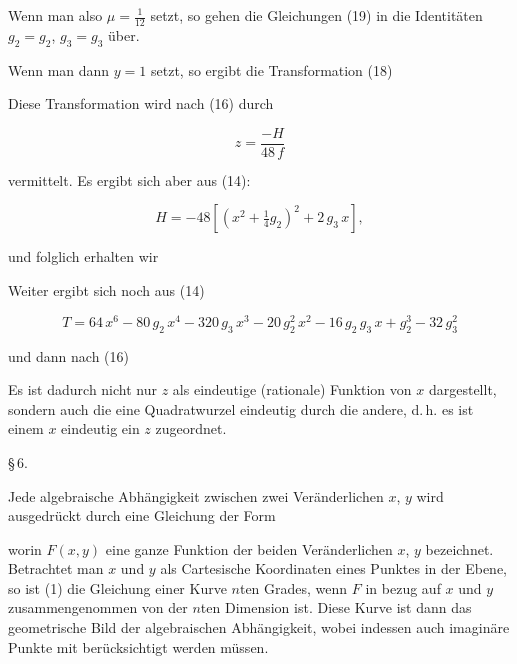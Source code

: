 
Wenn man also $\mu = \frac{1}{12}$ setzt, so gehen die Gleichungen (19)
in die Identitäten $g_2=g_2$, $g_3=g_3$ über.

Wenn man dann $y=1$ setzt, so ergibt die Transformation (18)


Diese Transformation wird nach (16) durch

\[ z = \dfrac{-H}{48\,f} \]

vermittelt. Es ergibt sich aber aus (14):

\[ H = -48\left[(x^2+\tfrac{1}{4}g_2)^2 + 2\,g_3\,x\right], \]

und folglich erhalten wir


Weiter ergibt sich noch aus (14)

\[ T = 64\,x^6 - 80\,g_2\,x^4 - 320\,g_3\,x^3 - 20\,g_2^2\,x^2 - 16\,g_2\,g_3\,x + g_2^3 - 32\,g_3^2 \]

und dann nach (16)


 Es ist dadurch nicht nur
$z$ als eindeutige (rationale) Funktion von $x$ dargestellt,
sondern auch die eine Quadratwurzel eindeutig durch die andere,
d.\,h. es ist einem  $x$ eindeutig ein  $z$ zugeordnet.

\begin{center}
§\,6. 
\end{center}

Jede algebraische Abhängigkeit zwischen zwei Veränderlichen
$x$, $y$ wird ausgedrückt durch eine Gleichung der Form


worin $F(x,y)$ eine ganze Funktion der beiden Veränderlichen $x$, $y$
bezeichnet. Betrachtet man $x$ und $y$ als Cartesische Koordinaten
eines Punktes in der Ebene, so ist (1) die Gleichung einer Kurve
$n$ten Grades, wenn $F$ in bezug auf $x$ und $y$ zusammengenommen
von der $n$ten Dimension ist. Diese Kurve ist dann das geometrische
 Bild der algebraischen Abhängigkeit, wobei indessen auch
imaginäre Punkte mit berücksichtigt werden müssen.
